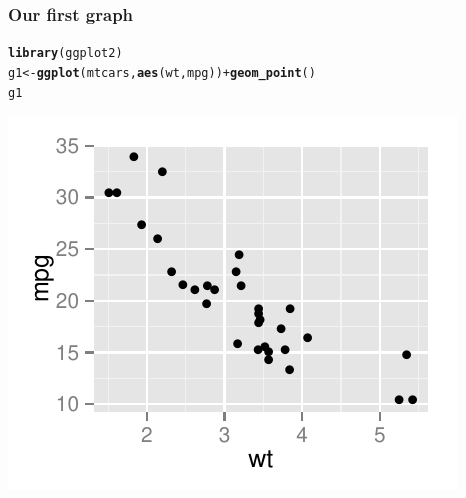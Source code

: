 \documentclass{beamer}\usepackage{graphicx, color}
\makeatletter
\def\maxwidth{ %
  \ifdim\Gin@nat@width>\linewidth
    \linewidth
  \else
    \Gin@nat@width
  \fi
}
\newcommand{\hlfunctioncall}[1]{\textcolor[rgb]{0.501960784313725,0,0.329411764705882}{\textbf{#1}}}%
\newenvironment{kframe}{%
 \def\at@end@of@kframe{}%
 \ifinner\ifhmode%
  \def\at@end@of@kframe{\end{minipage}}%
  \begin{minipage}{\columnwidth}%
 \fi\fi%
 \def\FrameCommand##1{\hskip\@totalleftmargin \hskip-\fboxsep
 \colorbox{shadecolor}{##1}\hskip-\fboxsep
     \hskip-\linewidth \hskip-\@totalleftmargin \hskip\columnwidth}%
 \MakeFramed {\advance\hsize-\width
   \@totalleftmargin\z@ \linewidth\hsize
   \@setminipage}}%
 {\par\unskip\endMakeFramed%
 \at@end@of@kframe}
\newenvironment{knitrout}{}{} %
\makeatother
\begin{document}
\begin{frame}[fragile]
  \frametitle{Our first graph}
\begin{knitrout}
\color{fgcolor}\begin{kframe}
\begin{alltt}
\hlfunctioncall{library}(ggplot2)
g1 <- \hlfunctioncall{ggplot}(mtcars, \hlfunctioncall{aes}(wt, mpg)) + \hlfunctioncall{geom_point}()
g1
\end{alltt}
\end{kframe}
\includegraphics[width=\maxwidth]{figure/first} 

\end{knitrout}


\end{frame}
\end{document}
